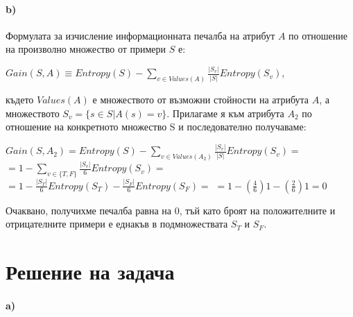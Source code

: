 \documentclass[12pt]{article}
\begin{document}
	\paragraph{b)}
	Формулата за изчисление информационната печалба на атрибут $A$ по отношение на произволно множество от примери $S$ е:
	
	\begin{center}
		$Gain(S, A) \equiv Entropy(S) - \displaystyle\sum_{v \in Values(A)} \frac{|S_{v}|}{|S|}Entropy(S_{v})$,
	\end{center}
	където $Values(A)$ е множеството от възможни стойности на атрибута $A$, а множеството $S_{v} = \{ s \in S | A(s) = v \}$.\newline\newline
	Прилагаме я към атрибута $A_{2}$ по отношение на конкретното множество S и последователно получаваме:
	
	\begin{center}
		$Gain(S, A_{2}) = Entropy(S) - \displaystyle\sum_{v \in Values(A_{2})} \frac{|S_{v}|}{|S|}Entropy(S_{v}) =$\newline
		$= 1 - \displaystyle\sum_{v \in \{T, F\}} \frac{|S_{v}|}{6}Entropy(S_{v}) =$\newline
		$= 1 - \frac{|S_{T}|}{6}Entropy(S_{T}) - \frac{|S_{F}|}{6}Entropy(S_{F}) =$
		$ = 1 - (\frac{4}{6})1 - (\frac{2}{6})1 = 0$
	\end{center}
	Очаквано, получихме печалба равна на 0, тъй като броят на положителните и отрицателните примери е еднакъв в подмножествата $S_{T}$ и $S_{F}$.\newline
	\newpage
	
	\section{Решение на задача }
	\paragraph{a)}
	
\end{document}
